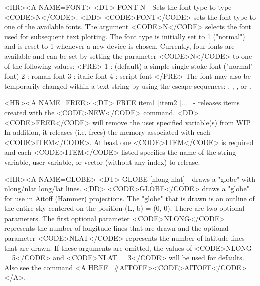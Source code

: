 \begin{rawhtml}
<HR><A NAME=FONT>
<DT>
FONT N - Sets the font type to type <CODE>N</CODE>.
<DD>
	<CODE>FONT</CODE> sets the font type to one of the available fonts.
	The argument <CODE>N</CODE> selects the font used for subsequent
	text plotting.  The font type is initially set to 1 ("normal")
	and is reset to 1 whenever a new device is chosen.  Currently,
	four fonts are available and can be set by setting the parameter
	<CODE>N</CODE> to one of the following values:
	<PRE>
    1 : (default) a simple single-stoke font ("normal" font)
    2 : roman font
    3 : italic font
    4 : script font
	</PRE>
	The font may also be temporarily changed within a text string
	by using the escape sequences: \fn, \fr, \fi, or \fs.

<HR><A NAME=FREE>
<DT>
FREE item1 [item2 [...]] - releases items created with the <CODE>NEW</CODE> command.
<DD>
	<CODE>FREE</CODE> will remove the user specified variable(s) from
	WIP.  In addition, it releases (i.e. frees) the memory associated
	with each <CODE>ITEM</CODE>.  At least one <CODE>ITEM</CODE> is
	required and each <CODE>ITEM</CODE> listed specifies the name of
	the string variable, user variable, or vector (without any index)
	to release.

<HR><A NAME=GLOBE>
<DT>
GLOBE [nlong nlat] - draws a "globe" with nlong/nlat long/lat lines.
<DD>
	<CODE>GLOBE</CODE> draws a "globe" for use in Aitoff (Hammer)
	projections.  The "globe" that is drawn is an outline of the
	entire sky centered on the position (L, b) = (0, 0).  There
	are two optional parameters.  The first optional parameter
	<CODE>NLONG</CODE> represents the number of longitude lines
	that are drawn and the optional parameter <CODE>NLAT</CODE>
	represents the number of latitude lines that are drawn.  If
	these arguments are omitted, the values of <CODE>NLONG = 5</CODE>
	and <CODE>NLAT = 3</CODE> will be used for defaults.
	Also see the command <A HREF=#AITOFF><CODE>AITOFF</CODE></A>.


\end{rawhtml}
